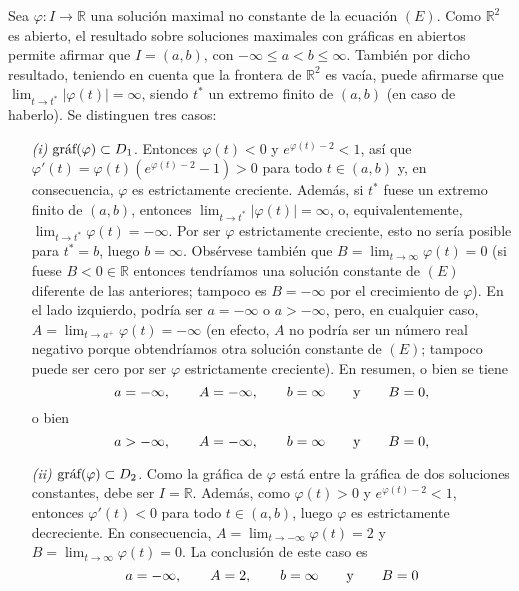 \documentclass[11pt]{report}
\newcommand{\R}{\mathbb R}
\begin{document}
Sea $\varphi \colon I \to \R$ una solución maximal no constante de la ecuación $(E)$. Como $\R^2$ es abierto, el resultado sobre soluciones maximales con gráficas en abiertos permite afirmar que $I=(a,b)$, con $-\infty \leq a <b \leq \infty$. También por dicho resultado, teniendo en cuenta que la frontera de $\R^2$ es vacía, puede afirmarse que $\lim_{t \to t^*}|\varphi(t)|=\infty$, siendo $t^*$ un extremo finito de $(a,b)$ (en caso de haberlo). Se distinguen tres casos:
\begin{itemize}
    \item[\textit{(i)}] $\textup{gráf}(\varphi) \subset D_1$. Entonces $\varphi(t) <0$ y $e^{\varphi(t)-2} <1$, así que $\varphi'(t)=\varphi(t)(e^{\varphi(t)-2}-1) >0$ para todo $t \in (a,b)$ y, en consecuencia, $\varphi$ es estrictamente creciente. Además, si $t^*$ fuese un extremo finito de $(a,b)$, entonces $\lim_{t \to t^*}|\varphi(t)|=\infty$, o, equivalentemente, $\lim_{t \to t^*}\varphi(t)=-\infty$. Por ser $\varphi$ estrictamente creciente, esto no sería posible para $t^*=b$, luego $b=\infty$. Obsérvese también que $B=\lim_{t \to \infty}\varphi(t)=0$ (si fuese $B<0 \in \R$ entonces tendríamos una solución constante de $(E)$ diferente de las anteriores; tampoco es $B=-\infty$ por el crecimiento de $\varphi$). En el lado izquierdo, podría ser $a=-\infty$ o $a>-\infty$, pero, en cualquier caso, $A=\lim_{t \to a^{+}} \varphi(t)=-\infty$ (en efecto, $A$ no podría ser un número real negativo porque obtendríamos otra solución constante de $(E)$; tampoco puede ser cero por ser $\varphi$ estrictamente creciente). En resumen, o bien se tiene
    \[a=-\infty, \qquad A=-\infty, \qquad b=\infty \qquad \textup{y} \qquad B=0,\]
    o bien
    \[a>-\infty, \qquad A=-\infty, \qquad b=\infty \qquad \textup{y} \qquad B=0,\]
    \item[\textit{(ii)}] $\textup{gráf}(\varphi) \subset D_2$. Como la gráfica de $\varphi$ está entre la gráfica de dos soluciones constantes, debe ser $I=\R$. Además, como $\varphi(t)>0$ y $e^{\varphi(t)-2}<1$, entonces $\varphi'(t)<0$ para todo $t \in (a,b)$, luego $\varphi$ es estrictamente decreciente. En consecuencia, $A=\lim_{t \to -\infty} \varphi(t)=2$ y $B=\lim_{t \to \infty}\varphi(t)=0$. La conclusión de este caso es
    \[a=-\infty, \qquad A=2, \qquad b=\infty \qquad \textup{y} \qquad B=0\]

\end{itemize}
\end{document}
